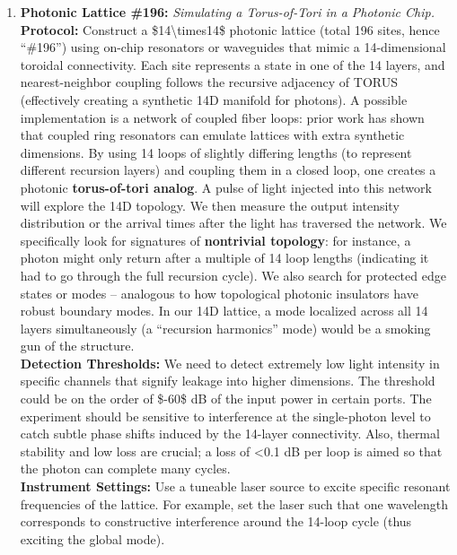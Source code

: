 \documentclass[]{article}
\begin{document}
\begin{enumerate}
\def\labelenumi{\arabic{enumi}.}
\item
  \textbf{Photonic Lattice \#196:} \emph{Simulating a Torus-of-Tori in a
  Photonic Chip.}\\
  \textbf{Protocol:} Construct a \$14\textbackslash{}times14\$ photonic
  lattice (total 196 sites, hence ``\#196'') using on-chip resonators or
  waveguides that mimic a 14-dimensional toroidal connectivity. Each
  site represents a state in one of the 14 layers, and nearest-neighbor
  coupling follows the recursive adjacency of TORUS (effectively
  creating a synthetic 14D manifold for photons). A possible
  implementation is a network of coupled fiber loops: prior work has
  shown that coupled ring resonators can emulate lattices with extra
  synthetic dimensions​. By using 14 loops of slightly differing lengths
  (to represent different recursion layers) and coupling them in a
  closed loop, one creates a photonic \textbf{torus-of-tori analog}. A
  pulse of light injected into this network will explore the 14D
  topology. We then measure the output intensity distribution or the
  arrival times after the light has traversed the network. We
  specifically look for signatures of \textbf{nontrivial topology}: for
  instance, a photon might only return after a multiple of 14 loop
  lengths (indicating it had to go through the full recursion cycle). We
  also search for protected edge states or modes -- analogous to how
  topological photonic insulators have robust boundary modes​. In our
  14D lattice, a mode localized across all 14 layers simultaneously (a
  ``recursion harmonics'' mode) would be a smoking gun of the
  structure.\\
  \textbf{Detection Thresholds:} We need to detect extremely low light
  intensity in specific channels that signify leakage into higher
  dimensions. The threshold could be on the order of \$-60\$ dB of the
  input power in certain ports. The experiment should be sensitive to
  interference at the single-photon level to catch subtle phase shifts
  induced by the 14-layer connectivity. Also, thermal stability and low
  loss are crucial; a loss of \textless{}0.1 dB per loop is aimed so
  that the photon can complete many cycles.\\
  \textbf{Instrument Settings:} Use a tuneable laser source to excite
  specific resonant frequencies of the lattice. For example, set the
  laser such that one wavelength corresponds to constructive
  interference around the 14-loop cycle (thus exciting the global mode).

\end{enumerate}
\end{document}
